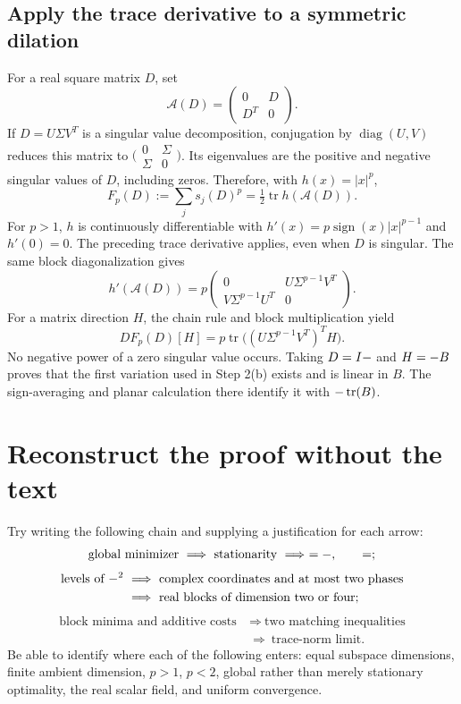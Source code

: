 \documentclass[11pt]{article}
\numberwithin{equation}{section}
\newcommand{\W}{\sym{Wcompetitor}}
\newcommand{\Ggrad}{\sym{SpectralGradient}}
\newcommand{\Jsrc}{\sym{Jreflect}}
\begin{document}
\subsection*{Apply the trace derivative to a symmetric dilation}
For a real square matrix $D$, set
\[
 \mathcal A(D)=\begin{pmatrix}0&D\\D^T&0\end{pmatrix}.
\]
If $D=U\Sigma V^T$ is a singular value decomposition, conjugation by
$\operatorname{diag}(U,V)$ reduces this matrix to
$\bigl(\begin{smallmatrix}0&\Sigma\\\Sigma&0\end{smallmatrix}\bigr)$.
Its eigenvalues are the positive and negative singular values of $D$,
including zeros. Therefore, with $h(x)=|x|^p$,
\[
 F_p(D):=\sum_j s_j(D)^p
       =\tfrac12\operatorname{tr}h(\mathcal A(D)).
\]
For $p>1$, $h$ is continuously differentiable with
$h'(x)=p\operatorname{sign}(x)|x|^{p-1}$ and $h'(0)=0$.
The preceding trace derivative applies, even when $D$ is singular.
The same block diagonalization gives
\[
 h'(\mathcal A(D))=
 p\begin{pmatrix}0&U\Sigma^{p-1}V^T\\
                       V\Sigma^{p-1}U^T&0\end{pmatrix}.
\]
For a matrix direction $H$, the chain rule and block multiplication yield
\[
 DF_p(D)[H]
       =p\operatorname{tr}\bigl((U\Sigma^{p-1}V^T)^T H\bigr).
\]
No negative power of a zero singular value occurs.
Taking $D=I-\W$ and $H=-\W B$ proves that the first variation used in
Step 2(b) exists and is linear in $B$. The sign-averaging and planar
calculation there identify it with $-\operatorname{tr}(\Ggrad B)$.

\section{Reconstruct the proof without the text}

Try writing the following chain and supplying a justification for each arrow:
\[
 \text{global minimizer}
 \ \Longrightarrow\ \text{stationarity}
 \ \Longrightarrow\ \Jsrc\Ggrad\Jsrc=-\Ggrad,
 \qquad \Ggrad\W=\W\Ggrad;
\]
\[
 \begin{aligned}
 \text{levels of }-\Ggrad^2
 &\ \Longrightarrow\ \text{complex coordinates and at most two phases}\\
 &\ \Longrightarrow\ \text{real blocks of dimension two or four};
 \end{aligned}
\]
\[
 \begin{aligned}
 \text{block minima and additive costs}
 &\ \Longrightarrow\ \text{two matching inequalities}\\
 &\ \Longrightarrow\ \text{trace-norm limit}.
 \end{aligned}
\]
Be able to identify where each of the following enters: equal subspace
dimensions, finite ambient dimension, $p>1$, $p<2$, global rather than
merely stationary optimality, the real scalar field, and uniform convergence.
\end{document}
